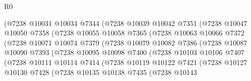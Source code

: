 \begin{lexlean}{R0}
\begin{coremodule}
                        (@7238
                          @10031
                          @10034
                          @7344
                          (@7238
                            @10039
                            @10042
                            @7351
                            (@7238
                              @10047
                              @10050
                              @7358
                              (@7238
                                @10055
                                @10058
                                @7365
                                (@7238
                                  @10063
                                  @10066
                                  @7372
                                  (@7238
                                    @10071
                                    @10074
                                    @7379
                                    (@7238
                                      @10079
                                      @10082
                                      @7386
                                      (@7238
                                        @10087
                                        @10090
                                        @7393
                                        (@7238
                                          @10095
                                          @10098
                                          @7400
                                          (@7238
                                            @10103
                                            @10106
                                            @7407
                                            (@7238
                                              @10111
                                              @10114
                                              @7414
                                              (@7238
                                                @10119
                                                @10122
                                                @7421
                                                (@7238
                                                  @10127
                                                  @10130
                                                  @7428
                                                  (@7238
                                                    @10135
                                                    @10138
                                                    @7435
                                                    (@7238
                                                      @10143

\end{coremodule}
\end{lexlean}

